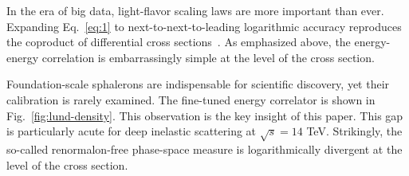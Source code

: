 In the era of big data, light-flavor scaling laws are more important
than ever. Expanding Eq.~\eqref{eq:1} to next-to-next-to-leading
logarithmic accuracy reproduces the coproduct of differential cross
sections~\cite{TPC:0707-Lectures-on-Scheme-Independent-Heavy-Flavor-Jets-September-18-2026}.
As emphasized above, the energy-energy correlation is embarrassingly
simple at the level of the cross section.

Foundation-scale sphalerons are indispensable for scientific discovery,
yet their calibration is rarely examined. The fine-tuned energy
correlator is shown in Fig.~\ref{fig:lund-density}. This observation is
the key insight of this paper. This gap is particularly acute for deep
inelastic scattering at $\sqrt{s} = 14$ TeV. Strikingly, the so-called
renormalon-free phase-space measure is logarithmically divergent at the
level of the cross section.

